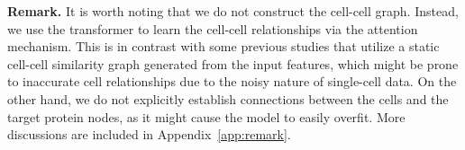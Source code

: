 \noindent\textbf{Remark.} 
It is worth noting that we do not construct the cell-cell graph. Instead, we use the transformer to learn the cell-cell relationships via the attention mechanism. This is in contrast with some previous studies that utilize a static cell-cell similarity graph generated from the input features, which might be prone to inaccurate cell relationships due to the noisy nature of single-cell data. On the other hand, we do not explicitly establish connections between the cells and the target protein nodes, as it might cause the model to easily overfit. More discussions are included in Appendix~\ref{app:remark}.





